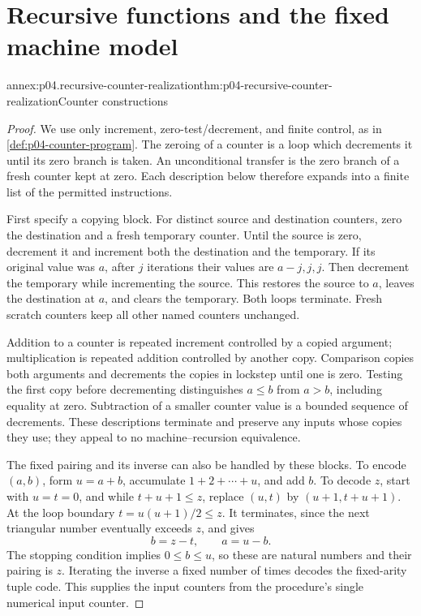 \section{Recursive functions and the fixed machine model}
\label{sec:annex-p04-recursive-machine-equivalence}

\begin{annexitem}{annex:p04.recursive-counter-realization}{thm:p04-recursive-counter-realization}{Counter constructions}
\begin{proof}
We use only increment, zero-test/decrement, and finite control, as in
\cref{def:p04-counter-program}. The zeroing of a counter is a loop which
decrements it until its zero branch is taken. An unconditional transfer
is the zero branch of a fresh counter kept at zero. Each description
below therefore expands into a finite list of the permitted instructions.

First specify a copying block. For distinct source and destination
counters, zero the destination and a fresh temporary counter. Until the
source is zero, decrement it and increment both the destination and the
temporary. If its original value was \(a\), after \(j\) iterations their
values are \(a-j,j,j\). Then decrement the temporary while incrementing
the source. This restores the source to \(a\), leaves the destination at
\(a\), and clears the temporary. Both loops terminate. Fresh scratch
counters keep all other named counters unchanged.

Addition to a counter is repeated increment controlled by a copied
argument; multiplication is repeated addition controlled by another
copy. Comparison copies both arguments and decrements the copies in
lockstep until one is zero. Testing the first copy before decrementing
distinguishes \(a\leq b\) from \(a>b\), including equality at zero.
Subtraction of a smaller counter value is a bounded sequence of
decrements. These descriptions terminate and preserve any inputs whose
copies they use; they appeal to no machine--recursion equivalence.

The fixed pairing and its inverse can also be handled by these blocks.
To encode \((a,b)\), form \(u=a+b\), accumulate
\(1+2+\cdots+u\), and add \(b\). To decode \(z\), start with
\(u=t=0\), and while \(t+u+1\leq z\), replace
\((u,t)\) by \((u+1,t+u+1)\). At the loop boundary
\(t=u(u+1)/2\leq z\). It terminates, since the next triangular
number eventually exceeds \(z\), and gives
\[
 b=z-t,\qquad a=u-b.
\]
The stopping condition implies \(0\leq b\leq u\), so these are natural
numbers and their pairing is \(z\). Iterating the inverse a fixed
number of times decodes the fixed-arity tuple code. This supplies the
input counters from the procedure's single numerical input counter.


\end{proof}
\end{annexitem}
